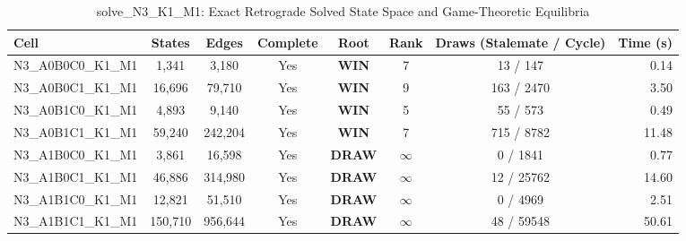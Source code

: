 \begin{table}[htbp]
\centering
\caption{solve\_N3\_K1\_M1: Exact Retrograde Solved State Space and Game-Theoretic Equilibria}
\label{tab:exact_solves}
\begin{tabular}{lccccccr}
\toprule
Cell & States & Edges & Complete & Root & Rank & Draws (Stalemate / Cycle) & Time (s) \\
\midrule
N3\_A0B0C0\_K1\_M1 & 1,341 & 3,180 & Yes & \textbf{WIN} & 7 & 13 / 147 & 0.14 \\
N3\_A0B0C1\_K1\_M1 & 16,696 & 79,710 & Yes & \textbf{WIN} & 9 & 163 / 2470 & 3.50 \\
N3\_A0B1C0\_K1\_M1 & 4,893 & 9,140 & Yes & \textbf{WIN} & 5 & 55 / 573 & 0.49 \\
N3\_A0B1C1\_K1\_M1 & 59,240 & 242,204 & Yes & \textbf{WIN} & 7 & 715 / 8782 & 11.48 \\
N3\_A1B0C0\_K1\_M1 & 3,861 & 16,598 & Yes & \textbf{DRAW} & $\infty$ & 0 / 1841 & 0.77 \\
N3\_A1B0C1\_K1\_M1 & 46,886 & 314,980 & Yes & \textbf{DRAW} & $\infty$ & 12 / 25762 & 14.60 \\
N3\_A1B1C0\_K1\_M1 & 12,821 & 51,510 & Yes & \textbf{DRAW} & $\infty$ & 0 / 4969 & 2.51 \\
N3\_A1B1C1\_K1\_M1 & 150,710 & 956,644 & Yes & \textbf{DRAW} & $\infty$ & 48 / 59548 & 50.61 \\
\bottomrule
\end{tabular}
\end{table}
